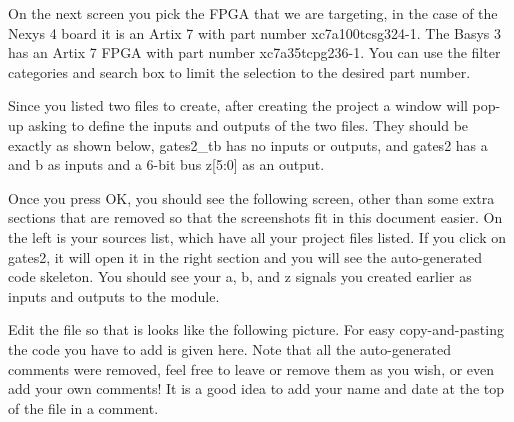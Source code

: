 On the next screen you pick the FPGA that we are targeting, in the case of the Nexys 4 board it is
an Artix 7 with part number xc7a100tcsg324-1.
The Basys 3 has an Artix 7 FPGA with part number xc7a35tcpg236-1.
You can use the filter categories and search box to limit the selection to the desired part number.

\begin{center}
\end{center}

Since you listed two files to create, after creating the project a window will pop-up asking to
define the inputs and outputs of the two files.
They should be exactly as shown below, gates2\_tb has no inputs or outputs, and gates2 has a and b
as inputs and a 6-bit bus z[5:0] as an output.


Once you press OK, you should see the following screen, other than some extra sections that are
removed so that the screenshots fit in this document easier.
On the left is your sources list, which have all your project files listed.
If you click on gates2, it will open it in the right section and you will see the auto-generated
code skeleton.
You should see your a, b, and z signals you created earlier as inputs and outputs to the module.


Edit the file so that is looks like the following picture.
For easy copy-and-pasting the code you have to add is given here.
Note that all the auto-generated comments were removed, feel free to leave or remove them as
you wish, or even add your own comments! It is a good idea to add your name and date at the top
of the file in a comment.

